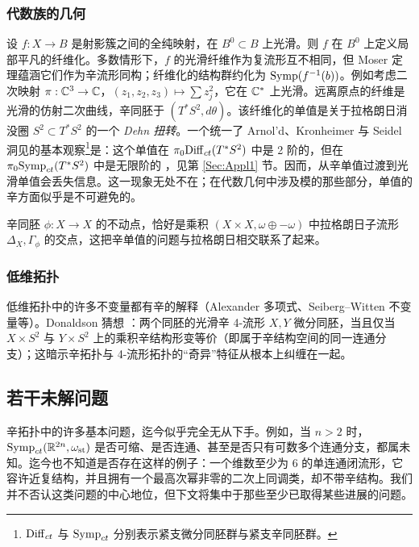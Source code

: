 \subsubsection{代数族的几何\label{Sec:AlgFamily}}

设 $f: X \rightarrow B$ 是射影簇之间的全纯映射，在 $B^0 \subset B$ 上光滑。则 $f$ 在 $B^0$ 上定义局部平凡的纤维化。多数情形下，$f$ 的光滑纤维作为复流形互不相同，但 Moser 定理蕴涵它们作为辛流形同构；纤维化的结构群约化为 $\mathrm{Symp}(f^{-1}(b))$。例如考虑二次映射 $\pi: \mathbb{C}^3 \rightarrow \mathbb{C}$，$(z_1,z_2,z_3) \mapsto \sum z_j^2$，它在 $\mathbb{C}^*$ 上光滑。远离原点的纤维是光滑的仿射二次曲线，辛同胚于 $(T^*S^2, d\theta)$。该纤维化的单值是关于拉格朗日消没圈 $S^2 \subset T^*S^2$ 的一个 \emph{Dehn 扭转}。一个统一了 Arnol'd、Kronheimer 与 Seidel 洞见的基本观察\footnote{$\mathrm{Diff}_{ct}$ 与 $\mathrm{Symp}_{ct}$ 分别表示紧支微分同胚群与紧支辛同胚群。}是：这个单值在 $\pi_0 \mathrm{Diff}_{ct}(T^*S^2)$ 中是 2 阶的，但在 $\pi_0 \mathrm{Symp}_{ct}(T^*S^2)$ 中是无限阶的 \cite{Seidel:twist}，见第 \ref{Sec:Appl1} 节。因而，从辛单值过渡到光滑单值会丢失信息。这一现象无处不在；在代数几何中涉及模的那些部分，单值的辛方面似乎是不可避免的。

辛同胚 $\phi: X \rightarrow X$ 的不动点，恰好是乘积 $(X\times X, \omega \oplus -\omega)$ 中拉格朗日子流形 $\Delta_X, \Gamma_{\phi}$ 的交点，这把辛单值的问题与拉格朗日相交联系了起来。

\subsubsection{低维拓扑}

低维拓扑中的许多不变量都有辛的解释（Alexander 多项式、Seiberg--Witten 不变量等）。Donaldson 猜想 \cite[p.437]{McD-S}：两个同胚的光滑辛 4-流形 $X,Y$ 微分同胚，当且仅当 $X\times S^2$ 与 $Y\times S^2$ 上的乘积辛结构形变等价（即属于辛结构空间的同一连通分支）；这暗示辛拓扑与 4-流形拓扑的“奇异”特征从根本上纠缠在一起。

\subsection{若干未解问题}

辛拓扑中的许多基本问题，迄今似乎完全无从下手。例如，当 $n>2$ 时，$\mathrm{Symp}_{ct}(\mathbb{R}^{2n}, \omega_{\operatorname{st}})$ 是否可缩、是否连通、甚至是否只有可数多个连通分支，都属未知。迄今也不知道是否存在这样的例子：一个维数至少为 6 的单连通闭流形，它容许近复结构，并且拥有一个最高次幂非零的二次上同调类，却不带辛结构。我们并不否认这类问题的中心地位，但下文将集中于那些至少已取得某些进展的问题。

